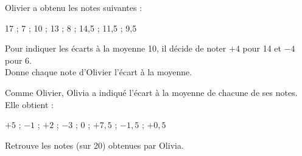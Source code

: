 \begin{myenumerate}
  \item Olivier a obtenu les notes suivantes :
    \begin{center}
      17 ; 7 ; 10 ; 13 ; 8 ; 14,5 ; 11,5 ; 9,5
    \end{center}
Pour indiquer les écarts à la moyenne 10, il décide de noter $+4$ pour 14 et $-4$ pour 6.
\\Donne chaque note d'Olivier l'écart à la moyenne.
\item Comme Olivier, Olivia a indiqué l'écart à la moyenne de chacune de ses notes. Elle obtient :
  \begin{center}
    $+5$ ; $-1$ ; $+2$ ; $-3$ ; 0 ; $+7,5$ ; $-1,5$ ; $+0,5$
  \end{center}
Retrouve les notes (sur 20) obtenues par Olivia.
\end{myenumerate}